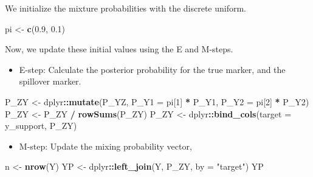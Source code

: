 \documentclass[
]{article}
\newenvironment{Shaded}{\begin{snugshade}}{\end{snugshade}}
\newcommand{\AttributeTok}[1]{\textcolor[rgb]{0.13,0.29,0.53}{#1}}
\newcommand{\DecValTok}[1]{\textcolor[rgb]{0.00,0.00,0.81}{#1}}
\newcommand{\FloatTok}[1]{\textcolor[rgb]{0.00,0.00,0.81}{#1}}
\newcommand{\FunctionTok}[1]{\textcolor[rgb]{0.13,0.29,0.53}{\textbf{#1}}}
\newcommand{\NormalTok}[1]{#1}
\newcommand{\OtherTok}[1]{\textcolor[rgb]{0.56,0.35,0.01}{#1}}
\newcommand{\SpecialCharTok}[1]{\textcolor[rgb]{0.81,0.36,0.00}{\textbf{#1}}}
\newcommand{\StringTok}[1]{\textcolor[rgb]{0.31,0.60,0.02}{#1}}
\providecommand{\tightlist}{%
  \setlength{\itemsep}{0pt}\setlength{\parskip}{0pt}}
\begin{document}
We initialize the mixture probabilities with the discrete uniform.

\begin{Shaded}
\begin{Highlighting}[]
\NormalTok{pi }\OtherTok{\textless{}{-}} \FunctionTok{c}\NormalTok{(}\FloatTok{0.9}\NormalTok{, }\FloatTok{0.1}\NormalTok{)}
\end{Highlighting}
\end{Shaded}

Now, we update these initial values using the E and M-steps.

\begin{itemize}
\tightlist
\item
  E-step: Calculate the posterior probability for the true marker, and the spillover marker.
\end{itemize}

\begin{Shaded}
\begin{Highlighting}[]
\NormalTok{P\_ZY }\OtherTok{\textless{}{-}}\NormalTok{ dplyr}\SpecialCharTok{::}\FunctionTok{mutate}\NormalTok{(P\_YZ, }
                      \AttributeTok{P\_Y1 =}\NormalTok{ pi[}\DecValTok{1}\NormalTok{] }\SpecialCharTok{*}\NormalTok{ P\_Y1, }
                      \AttributeTok{P\_Y2 =}\NormalTok{ pi[}\DecValTok{2}\NormalTok{] }\SpecialCharTok{*}\NormalTok{ P\_Y2)}
\NormalTok{P\_ZY }\OtherTok{\textless{}{-}}\NormalTok{ P\_ZY }\SpecialCharTok{/} \FunctionTok{rowSums}\NormalTok{(P\_ZY)}
\NormalTok{P\_ZY }\OtherTok{\textless{}{-}}\NormalTok{ dplyr}\SpecialCharTok{::}\FunctionTok{bind\_cols}\NormalTok{(}\AttributeTok{target =}\NormalTok{ y\_support, P\_ZY)}
\end{Highlighting}
\end{Shaded}

\begin{itemize}
\tightlist
\item
  M-step: Update the mixing probability vector,
\end{itemize}

\begin{Shaded}
\begin{Highlighting}[]
\NormalTok{n }\OtherTok{\textless{}{-}} \FunctionTok{nrow}\NormalTok{(Y)}
\NormalTok{YP }\OtherTok{\textless{}{-}}\NormalTok{ dplyr}\SpecialCharTok{::}\FunctionTok{left\_join}\NormalTok{(Y, P\_ZY, }\AttributeTok{by =} \StringTok{"target"}\NormalTok{)}
\NormalTok{YP}
\end{Highlighting}
\end{Shaded}
\end{document}
